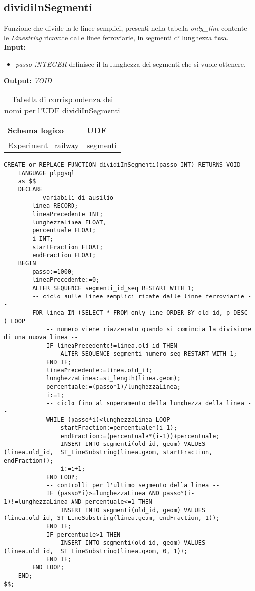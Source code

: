 \subsection{dividiInSegmenti}
Funzione che divide la le linee semplici, presenti nella tabella \textit{only\_line} contente le \textit{Linestring} ricavate dalle linee ferroviarie, in segmenti di lunghezza fissa.\\
\textbf{Input:} 
\begin{itemize}
\item \textit{passo INTEGER} definisce il la lunghezza dei segmenti che si vuole ottenere.
\end{itemize}
\textbf{Output:} \textit{VOID} 

\begin{table}[h]
\centering
\caption{Tabella di corrispondenza dei nomi per l'UDF dividiInSegmenti}
\label{mapTb6}
\begin{tabular}{|l|l|}
\hline
Schema logico       & UDF                \\ \hline
Experiment\_railway          & segmenti              \\ \hline
\end{tabular}
\end{table}

\begin{lstlisting}[style=mySQL]
CREATE or REPLACE FUNCTION dividiInSegmenti(passo INT) RETURNS VOID
	LANGUAGE plpgsql
	as $$
	DECLARE
		-- variabili di ausilio --
		linea RECORD;
		lineaPrecedente INT;
		lunghezzaLinea FLOAT;
		percentuale FLOAT;
		i INT;
		startFraction FLOAT;
		endFraction FLOAT;
	BEGIN
		passo:=1000;
		lineaPrecedente:=0;
		ALTER SEQUENCE segmenti_id_seq RESTART WITH 1;
		-- ciclo sulle linee semplici ricate dalle linne ferroviarie --
		FOR linea IN (SELECT * FROM only_line ORDER BY old_id, p DESC ) LOOP
			-- numero viene riazzerato quando si comincia la divisione di una nuova linea --
			IF lineaPrecedente!=linea.old_id THEN
				ALTER SEQUENCE segmenti_numero_seq RESTART WITH 1;
			END IF;
			lineaPrecedente:=linea.old_id;
			lunghezzaLinea:=st_length(linea.geom);
			percentuale:=(passo*1)/lunghezzaLinea;
			i:=1;
			-- ciclo fino al superamento della lunghezza della linea --
			WHILE (passo*i)<lunghezzaLinea LOOP
				startFraction:=percentuale*(i-1);
				endFraction:=(percentuale*(i-1))+percentuale;
				INSERT INTO segmenti(old_id, geom) VALUES (linea.old_id,  ST_LineSubstring(linea.geom, startFraction, endFraction));
				i:=i+1;
			END LOOP;
			-- controlli per l'ultimo segmento della linea --
			IF (passo*i)>=lunghezzaLinea AND passo*(i-1)!=lunghezzaLinea AND percentuale<=1 THEN
				INSERT INTO segmenti(old_id, geom) VALUES (linea.old_id, ST_LineSubstring(linea.geom, endFraction, 1));
			END IF;
			IF percentuale>1 THEN
				INSERT INTO segmenti(old_id, geom) VALUES (linea.old_id,  ST_LineSubstring(linea.geom, 0, 1));
			END IF;
		END LOOP;
	END;
$$;
\end{lstlisting}

